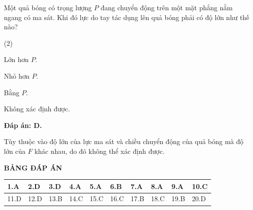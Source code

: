 \begin{enumerate}[label=\bfseries Câu \arabic*:]
	
	{Một quả bóng có trọng lượng $P$ đang chuyển động trên một mặt phẳng nằm ngang có ma sát. Khi đó lực do tay tác dụng lên quả bóng phải có độ lớn như thế nào?
		
		
	}
	
	\hideall
	{\textbf{Đáp án: D.}
		
		Tùy thuộc vào độ lớn của lực ma sát và chiều chuyển động của quả bóng mà độ lớn của $F$ khác nhau, do đó không thể xác định được.
	}
	
\end{enumerate}



\hideall
{
	\begin{center}
		\textbf{BẢNG ĐÁP ÁN}
	\end{center}
	\begin{center}
		\begin{tabular}{|m{2.8em}|m{2.8em}|m{2.8em}|m{2.8em}|m{2.8em}|m{2.8em}|m{2.8em}|m{2.8em}|m{2.8em}|m{2.8em}|}
			\hline
			1.A  & 2.D  & 3.D  & 4.A  & 5.A  & 6.B  & 7.A  & 8.A  & 9.A  & 10.C  \\
			\hline
			11.D  & 12.D  & 13.B  & 14.C  & 15.C  & 16.C  & 17.B  & 18.C  & 19.B  & 20.D  \\
			\hline
			
		\end{tabular}
	\end{center}
}
